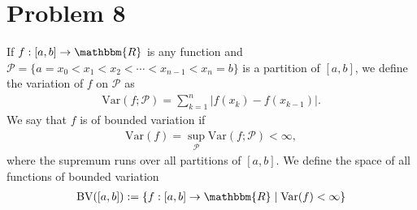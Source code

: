 \documentclass[10pt]{extarticle}
\newcommand{\R}{\mathbbm{R}}
\begin{document}
  \section{Problem 8}%
  If $f: [a,b]\rightarrow\R$ is any function and $\mathcal{P} = \{a=x_0<x_1<x_2 < \cdots < x_{n-1} < x_n = b\}$ is a partition of $[a,b]$, we define the variation of $f$ on $\mathcal{P}$ as
  \begin{align*}
    \text{Var}(f;\mathcal{P}) = \sum_{k=1}^{n}|f(x_k)-f(x_{k-1})|.
  \end{align*}
  We say that $f$ is of bounded variation if
  \begin{align*}
    \text{Var}(f) = \sup_{\mathcal{P}}\text{Var}(f;\mathcal{P}) < \infty,
  \end{align*}
  where the supremum runs over all partitions of $[a,b]$. We define the space of all functions of bounded variation
  \begin{align*}
    \text{BV}([a,b]) := \{f:[a,b]\rightarrow\R\mid \text{Var}(f)<\infty\}
  \end{align*}
\end{document}
